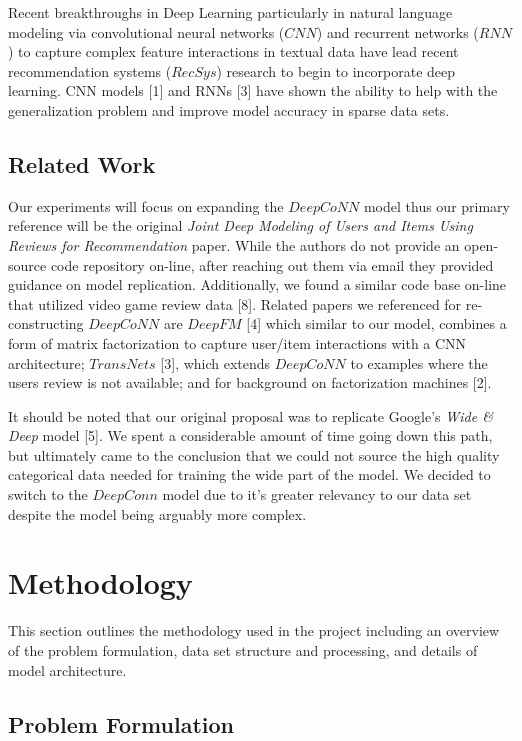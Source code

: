 \documentclass[10pt,twocolumn,letterpaper]{article}
\begin{document}
\par Recent breakthroughs in Deep Learning particularly in natural language modeling via convolutional neural networks ($CNN$) and recurrent networks ($RNN$) to capture complex feature interactions in textual data have lead recent recommendation systems ($RecSys$) research to begin to incorporate deep learning. CNN models [1] and RNNs [3] have shown the ability to help with the generalization problem and improve model accuracy in sparse data sets.

\subsection{Related Work}
Our experiments will focus on expanding the $DeepCoNN$ model thus our primary reference will be the original \textit{Joint Deep Modeling of Users and Items Using Reviews for Recommendation} paper. While the authors do not provide an open-source code repository on-line, after reaching out them via email they provided guidance on model replication. Additionally, we found a similar code base on-line that utilized video game review data [8]. Related papers we referenced for re-constructing $DeepCoNN$ are $DeepFM$ [4] which similar to our model, combines a form of matrix factorization to capture user/item interactions with a CNN architecture; $TransNets$ [3], which extends $DeepCoNN$ to examples where the users review is not available; and for background on factorization machines [2]. 

It should be noted that our original proposal was to replicate Google's \textit{Wide \& Deep} model [5]. We spent a considerable amount of time going down this path, but ultimately came to the conclusion that we could not source the high quality categorical data needed for training the wide part of the model. We decided to switch to the $DeepConn$ model due to it's greater relevancy to our data set despite the model being arguably more complex. 

\section{Methodology}
This section outlines the methodology used in the project including an overview of the problem formulation, data set structure and processing, and details of model architecture.

\subsection{Problem Formulation}
\end{document}
